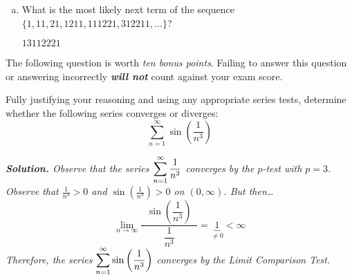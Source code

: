 \documentclass[12pt,letterpaper]{exam}
\begin{document}
\begin{questions}
\begin{enumerate}[(a)]
	\item What is the most likely next term of the sequence $\{ 1, 11, 21, 1211, 111221, 312211, \ldots \}$? \par\vspace{0.5cm} \underline{ \hspace{2cm} $13112221$ \hspace{2cm}}
	\end{enumerate} \par\vspace{0.5cm}
	
 The following question is worth \textit{ten bonus points}. Failing to answer this question or answering incorrectly \textit{\bfseries will not} count against your exam score. \par\vspace{0.3cm} 

Fully justifying your reasoning and using any appropriate series tests, determine whether the following series converges or diverges:	
	\[
	\sum_{n=1}^\infty \sin \left( \dfrac{1}{n^3} \right)
	\] \pspace

{\itshape \textbf{Solution.} Observe that the series $\displaystyle\sum_{n=1}^\infty \dfrac{1}{n^3}$ converges by the $p$-test with $p= 3$. Observe that $\frac{1}{n^3} > 0$ and $\sin(\frac{1}{n^3}) > 0$ on $(0, \infty)$. But then\dots
	\[
	\lim_{n \to \infty} \dfrac{\;\;\sin \left( \dfrac{1}{n^3} \right)\;\;}{\dfrac{1}{n^3}}= \underbrace{1}_{\neq 0} < \infty
	\]
Therefore, the series $\displaystyle\sum_{n=1}^\infty \sin \left( \dfrac{1}{n^3} \right)$ converges by the Limit Comparison Test.}

\end{questions}
\end{document}

